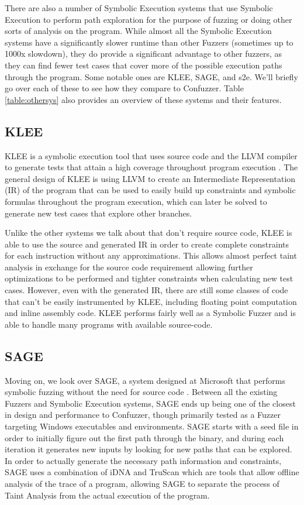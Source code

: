 There are also a number of Symbolic Execution systems that use Symbolic
Execution to perform path exploration for the purpose of fuzzing or doing other
sorts of analysis on the program. While almost all the Symbolic Execution
systems have a significantly slower runtime than other Fuzzers (sometimes up to
1000x slowdown), they do provide a significant advantage to other fuzzers, as
they can find fewer test cases that cover more of the possible execution paths
through the program. Some notable ones are KLEE, SAGE, and s2e. We'll briefly go
over each of these to see how they compare to Confuzzer. Table
\ref{table:othersys} also provides an overview of these systems and their
features.

\subsection{KLEE}
KLEE is a symbolic execution tool that uses source code and the LLVM compiler to
generate tests that attain a high coverage throughout program execution
\cite{klee}. The general design of KLEE is using LLVM to create an Intermediate
Representation (IR) of the program that can be used to easily build up constraints
and symbolic formulas throughout the program execution, which can later be
solved to generate new test cases that explore other branches.

Unlike the other systems we talk about that don't require source code, KLEE is
able to use the source and generated IR in order to create complete constraints
for each instruction without any approximations. This allows almost perfect
taint analysis in exchange for the source code requirement allowing further
optimizations to be performed and tighter constraints when calculating new test
cases. However, even with the generated IR, there are still some classes of code
that can't be easily instrumented by KLEE, including floating point computation
and inline assembly code. KLEE performs fairly well as a Symbolic Fuzzer and is
able to handle many programs with available source-code.

\subsection{SAGE}
Moving on, we look over SAGE, a system designed at Microsoft that performs
symbolic fuzzing without the need for source code \cite{sage}. Between
all the existing Fuzzers and Symbolic Execution systems, SAGE ends up being one
of the closest in design and performance to Confuzzer, though primarily tested
as a Fuzzer targeting Windows executables and environments. SAGE starts with a
seed file in order to initially figure out the first path through the binary,
and during each iteration it generates new inputs by looking for new paths that
can be explored. In order to actually generate the necessary path information
and constraints, SAGE uses a combination of iDNA and TruScan which are tools
that allow offline analysis of the trace of a program, allowing SAGE to separate
the process of Taint Analysis from the actual execution of the program.

